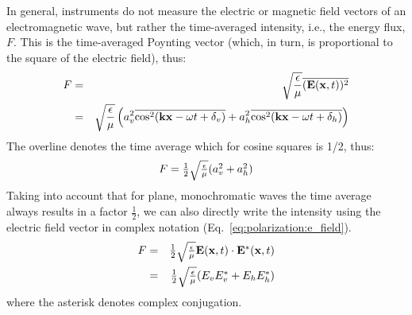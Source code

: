 In general, instruments do not measure the electric or magnetic field
vectors of an electromagnetic wave, but rather the time-averaged
intensity, i.e., the energy flux, $F$. This is the time-averaged Poynting
vector (which, in turn, is proportional to the square of the electric
field), thus:
\begin{eqnarray}
  F 
  &=& 
  \sqrt{\frac{\epsilon}{\mu}}\overline{(\mathbf{E}(\mathbf{x},t))^2}\\
   \nonumber
  &=&
  \sqrt{\frac{\epsilon}{\mu}}\left(
    a_v^2\overline{\cos^2(\mathbf{k}\mathbf{x} - \omega t + \delta_v)}
    + a_h^2\overline{\cos^2(\mathbf{k}\mathbf{x} - \omega t + \delta_h)}
   \right)
  \label{eq:polarization:intensity}
\end{eqnarray}
The overline denotes the time average
which for cosine squares is 1/2, thus:
\begin{equation}
  \label{eq:polarization:intensity2}
 F = 
  \textstyle\frac{1}{2}\sqrt{\frac{\epsilon}{\mu}}(
    a_v^2 + a_h^2)  
\end{equation}
Taking into account that for plane, monochromatic waves 
the time average always results in a factor
$\frac{1}{2}$, we can also directly write the intensity using the
electric field vector in complex notation
(Eq.~\ref{eq:polarization:e_field}).
\begin{eqnarray}
  \label{eq:polarization:intensity_from_complex}
  F &=&  \textstyle\frac{1}{2}\sqrt{\frac{\epsilon}{\mu}} \mathbf{E} (\mathbf{x},t) 
          \cdot \mathbf{E}^\ast (\mathbf{x},t)\\ \nonumber
    &=&   \textstyle\frac{1}{2}\sqrt{\frac{\epsilon}{\mu}}
          (E_v E_v^\ast + E_h E_h^\ast)
\end{eqnarray}
where the asterisk denotes complex conjugation.%

